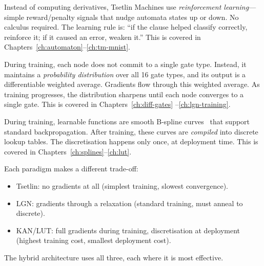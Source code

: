 \begin{description}[leftmargin=1em]
  \item[Tsetlin Machines~\cite{granmo2018tsetlin}: avoid gradients entirely.]
    Instead of computing derivatives, Tsetlin Machines use
    \emph{reinforcement learning}---simple reward/penalty signals that
    nudge automata states up or down. No calculus required. The
    learning rule is: ``if the clause helped classify correctly,
    reinforce it; if it caused an error, weaken it.'' This is covered
    in Chapters~\ref{ch:automaton}--\ref{ch:tm-mnist}.

  \item[Logic Gate Networks~\cite{petersen2022difflogic}: use a continuous relaxation.]
    During training, each node does not commit to a single gate type.
    Instead, it maintains a \emph{probability distribution} over all 16
    gate types, and its output is a differentiable weighted average.
    Gradients flow through this weighted average. As training
    progresses, the distribution sharpens until each node converges to
    a single gate. This is covered in Chapters~\ref{ch:diff-gates}
    --\ref{ch:lgn-training}.

  \item[KAN/LUT~\cite{liu2024kan}: train in continuous space, deploy discretely.]
    During training, learnable functions are smooth B-spline curves~\cite{deboor1978splines}
    that support standard backpropagation. After training, these
    curves are \emph{compiled} into discrete lookup tables. The
    discretisation happens only once, at deployment time. This is
    covered in Chapters~\ref{ch:splines}--\ref{ch:lut}.
\end{description}

\begin{keyinsight}
Each paradigm makes a different trade-off:
\begin{itemize}
  \item Tsetlin: no gradients at all (simplest training, slowest
    convergence).
  \item LGN: gradients through a relaxation (standard training, must
    anneal to discrete).
  \item KAN/LUT: full gradients during training, discretisation at
    deployment (highest training cost, smallest deployment cost).
\end{itemize}
The hybrid architecture uses all three, each where it is most
effective.
\end{keyinsight}
